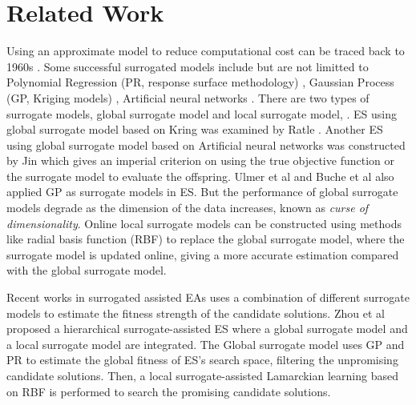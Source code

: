 




\section{Related Work}

Using an approximate model to reduce computational cost can be traced back to 1960s \cite{Dunham1963}. Some successful surrogated models include but are not limitted to Polynomial Regression (PR, response surface methodology) \cite{doi:10.1080/00401706.1966.10490404}, Gaussian Process (GP, Kriging models) \cite{sacks1989}, Artificial neural networks \cite{Smith:1993:NNS:583180}. There are two types of surrogate models, global surrogate model and local surrogate model, . ES using global surrogate model based on Kring was examined by Ratle \cite{Ratle:2001:KSF:966173.966177}. Another ES using global surrogate model based on Artificial neural networks was constructed by Jin \cite{Jin02aframework} which gives an imperial criterion on using the true objective function or the surrogate model to evaluate the offspring. Ulmer et al \cite{Ulmer03evolutionstrategies} and Buche et al \cite{1424193} also applied GP as surrogate models in ES. But the performance of global surrogate models degrade as the dimension of the data increases, known as \textit{curse of dimensionality}. Online local surrogate models \cite{4033013} can be constructed using methods like radial basis function (RBF) \cite{GIANNAKOGLOU200243} to replace the global surrogate model, where the surrogate model is updated online, giving a more accurate estimation compared with the global surrogate model.


Recent works in surrogated assisted EAs uses a combination of different surrogate models to estimate the fitness strength of the candidate solutions. Zhou et al \cite{4033013} proposed a hierarchical surrogate-assisted ES where a global surrogate model and a local surrogate model are integrated. The Global surrogate model uses GP and PR to estimate the global fitness of ES's search space, filtering the unpromising candidate solutions. Then, a local surrogate-assisted Lamarckian learning based on RBF is performed to search the promising candidate solutions. 


